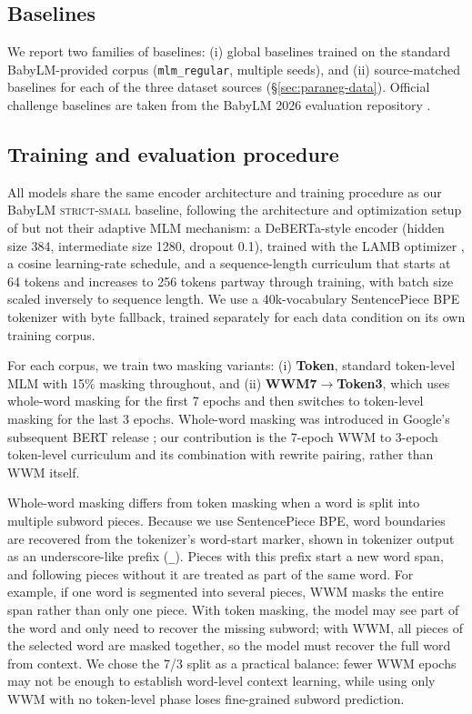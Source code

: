 \documentclass[11pt]{article}
\begin{document}
\subsection{Baselines}

We report two families of baselines: (i) global baselines trained on the standard BabyLM-provided corpus (\texttt{mlm\_regular}, multiple seeds), and (ii) source-matched baselines for each of the three dataset sources (\S\ref{sec:paraneg-data}). Official challenge baselines are taken from the BabyLM 2026 evaluation repository \citep{babylm2026eval}.

\subsection{Training and evaluation procedure}

All models share the same encoder architecture and training procedure as our BabyLM \textsc{strict-small} baseline, following the architecture and optimization setup of \citet{edman-fraser-2025-mask} but not their adaptive MLM mechanism: a DeBERTa-style encoder \citep{he2021deberta} (hidden size 384, intermediate size 1280, dropout 0.1), trained with the LAMB optimizer \citep{you2020lamb}, a cosine learning-rate schedule, and a sequence-length curriculum that starts at 64 tokens and increases to 256 tokens partway through training, with batch size scaled inversely to sequence length. We use a 40k-vocabulary SentencePiece BPE tokenizer \citep{kudo2018sentencepiece,sennrich2016bpe} with byte fallback, trained separately for each data condition on its own training corpus.

For each corpus, we train two masking variants: (i) \textbf{Token}, standard token-level MLM with 15\% masking throughout, and (ii) \textbf{WWM7$\to$Token3}, which uses whole-word masking for the first 7 epochs and then switches to token-level masking for the last 3 epochs. Whole-word masking was introduced in Google's subsequent BERT release \citep{devlin2019bert,google2019bertwwm}; our contribution is the 7-epoch WWM to 3-epoch token-level curriculum and its combination with rewrite pairing, rather than WWM itself.

Whole-word masking differs from token masking when a word is split into multiple subword pieces. Because we use SentencePiece BPE, word boundaries are recovered from the tokenizer's word-start marker, shown in tokenizer output as an underscore-like prefix (\texttt{\_}). Pieces with this prefix start a new word span, and following pieces without it are treated as part of the same word. For example, if one word is segmented into several pieces, WWM masks the entire span rather than only one piece. With token masking, the model may see part of the word and only need to recover the missing subword; with WWM, all pieces of the selected word are masked together, so the model must recover the full word from context. We chose the 7/3 split as a practical balance: fewer WWM epochs may not be enough to establish word-level context learning, while using only WWM with no token-level phase loses fine-grained subword prediction.
\end{document}
